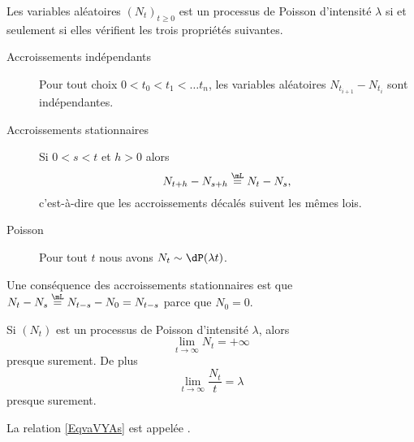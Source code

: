 \begin{theorem}
	Les variables aléatoires \( (N_t)_{t\geq 0}\) est un processus de Poisson d'intensité \( \lambda\) si et seulement si elles vérifient les trois propriétés suivantes.
	\begin{description}
		\item[Accroissements indépendants] Pour tout choix \( 0<t_0<t_1<\ldots t_n\), les variables aléatoires \( N_{t_{i+1}}-N_{t_i}\) sont indépendantes.
		\item[Accroissements stationnaires] Si \( 0<s<t\) et \( h>0\) alors
		      \begin{equation}
			      N_{t+h}-N_{s+h}\stackrel{\mL}{=}N_t-N_s,
		      \end{equation}
		      c'est-à-dire que les accroissements décalés suivent les mêmes lois.
		\item[Poisson] Pour tout \( t\) nous avons \( N_t\sim\dP(\lambda t)\).
	\end{description}
\end{theorem}
Une conséquence des accroissements stationnaires est que \( N_t-N_s\stackrel{\mL}{=}N_{t-s}-N_0=N_{t-s}\) parce que \( N_0=0\).

\begin{proposition}
	Si \( (N_t)\) est un processus de Poisson d'intensité \( \lambda\), alors
	\begin{equation}
		\lim_{t\to \infty} N_t=+\infty
	\end{equation}
	presque surement. De plus
	\begin{equation}        \label{EqvaVYAs}
		\lim_{t\to \infty} \frac{ N_t }{ t }=\lambda
	\end{equation}
	presque surement.
\end{proposition}
La relation \eqref{EqvaVYAs} est appelée .

